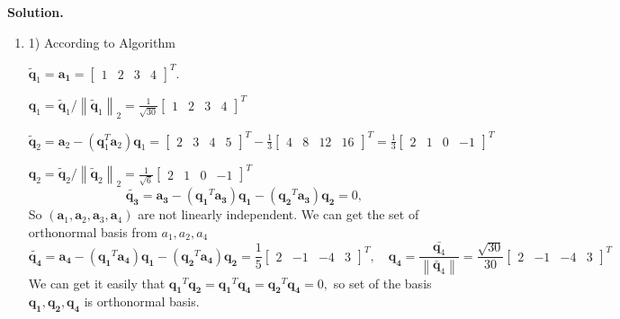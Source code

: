 \documentclass[english,onecolumn]{IEEEtran}
\begin{document}
\noindent
\textbf{Solution.}
\begin{enumerate}
	\item 
	1) According to Algorithm
	
	$\tilde{\mathbf{q}}_{1}=\mathbf{a_{1}}=\left[\begin{array}{llll}1 & 2 & 3 & 4\end{array}\right]^{T}$.

$\mathbf{q}_{1}=\tilde{\mathbf{q}}_{1} /\left\|\tilde{\mathbf{q}}_{1}\right\|_{2}=\frac{1}{\sqrt{30}}\left[\begin{array}{llll}1 & 2 & 3 & 4\end{array}\right]^{T}$

$\tilde{\mathbf{q}}_{2}=\mathbf{a}_{2}-\left(\mathbf{q}_{1}^{T} \mathbf{a}_{2}\right) \mathbf{q}_{1}=\left[\begin{array}{llll}2 & 3 & 4 & 5\end{array}\right]^{T}-\frac{1}{3}\left[\begin{array}{llll}4 & 8 & 12 & 16\end{array}\right]^{T}=\frac{1}{3}\left[\begin{array}{llll}2 & 1 & 0 & -1\end{array}\right]^{T}$

$\mathbf{q}_{2}=\tilde{\mathbf{q}}_{2} /\left\|\tilde{\mathbf{q}}_{2}\right\|_{2}=\frac{1}{\sqrt{6}}\left[\begin{array}{llll}2 & 1 & 0 & -1\end{array}\right]^{T}$
	$$\tilde{\mathbf{q_{3}}}=\mathbf{a_{3}}-\left(\mathbf{q_{1}}^{T} \mathbf{a_{3}}\right) \mathbf{q_{1}}-\left(\mathbf{q_{2}}^{T} \mathbf{a_{3}}\right) \mathbf{q_{2}}=0,$$
	So $\left(\mathbf{a}_{1}, \mathbf{a}_{2}, \mathbf{a}_{3}, \mathbf{a}_{4}\right)$ are not linearly independent. We can get the set
	of orthonormal basis from 
	$a_{1}, a_{2}, a_{4}$
	$$
	\tilde{\mathbf{q_{4}}}=\mathbf{a_{4}}-\left(\mathbf{q_{1}}^{T} \mathbf{a_{4}}\right) \mathbf{q_{1}}-\left(\mathbf{q_{2}}^{T} \mathbf{a_{4}}\right) \mathbf{q_{2}}=\frac{1}{5}\left[\begin{array}{ccccc}
		2 & -1 & -4 & 3
	\end{array}\right]^{T}, \quad \mathbf{q_{4}}=\frac{\bar{\mathbf{q}_{4}}}{\left\|\bar{\mathbf{q}}_{4}\right\|}=\frac{\sqrt{30}}{30}\left[\begin{array}{cccc}
		2 & -1 & -4 & 3
	\end{array}\right]^{T}
	$$
	We can get it easily that $\mathbf{q_{1}}^{T} \mathbf{q_{2}}=\mathbf{q_{1}}^{T} \mathbf{q_{4}}=\mathbf{q_{2}}^{T} \mathbf{q_{4}}=0,$ so set of the basis $\mathbf{q_{1}}, \mathbf{q_{2}}, \mathbf{q_{4}}$ is orthonormal basis.
	

\end{enumerate}
\end{document}
